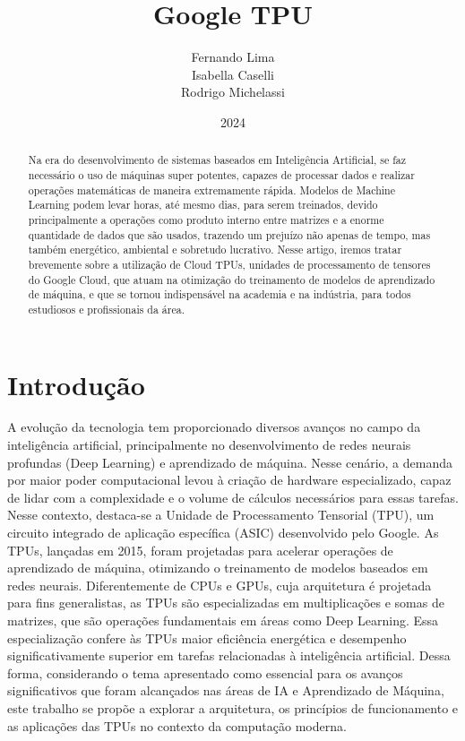 \documentclass{report}
\title{Google TPU}
\author{Fernando Lima \\ Isabella Caselli \\ Rodrigo Michelassi}
\date{2024}
\begin{document}
\maketitle
\tableofcontents	%

\begin{abstract}
Na era do desenvolvimento de sistemas baseados em Inteligência Artificial, se faz necessário o uso de máquinas super potentes, capazes de processar dados e realizar operações matemáticas de maneira extremamente rápida. Modelos de Machine Learning podem levar horas, até mesmo dias, para serem treinados, devido principalmente a operações como produto interno entre matrizes e a enorme quantidade de dados que são usados, trazendo um prejuízo não apenas de tempo, mas também energético, ambiental e sobretudo lucrativo. Nesse artigo, iremos tratar brevemente sobre a utilização de Cloud TPUs, unidades de processamento de tensores do Google Cloud, que atuam na otimização do treinamento de modelos de aprendizado de máquina, e que se tornou indispensável na academia e na indústria, para todos estudiosos e profissionais da área.
\end{abstract}

\chapter{Introdução}
A evolução da tecnologia tem proporcionado diversos avanços no campo da inteligência artificial, principalmente no desenvolvimento de redes neurais profundas (Deep Learning) e aprendizado de máquina. Nesse cenário, a demanda por maior poder computacional levou à criação de hardware especializado, capaz de lidar com a complexidade e o volume de cálculos necessários para essas tarefas. Nesse contexto, destaca-se a Unidade de Processamento Tensorial (TPU), um circuito integrado de aplicação específica (ASIC) desenvolvido pelo Google.
As TPUs, lançadas em 2015, foram projetadas para acelerar operações de aprendizado de máquina, otimizando o treinamento de modelos baseados em redes neurais. Diferentemente de CPUs e GPUs, cuja arquitetura é projetada para fins generalistas, as TPUs são especializadas em multiplicações e somas de matrizes, que são operações fundamentais em áreas como Deep Learning. Essa especialização confere às TPUs maior eficiência energética e desempenho significativamente superior em tarefas relacionadas à inteligência artificial.
Dessa forma, considerando o tema apresentado como essencial para os avanços significativos que foram alcançados nas áreas de IA e Aprendizado de Máquina, este trabalho se propõe a explorar a arquitetura, os princípios de funcionamento e as aplicações das TPUs no contexto da computação moderna. 
\end{document}
